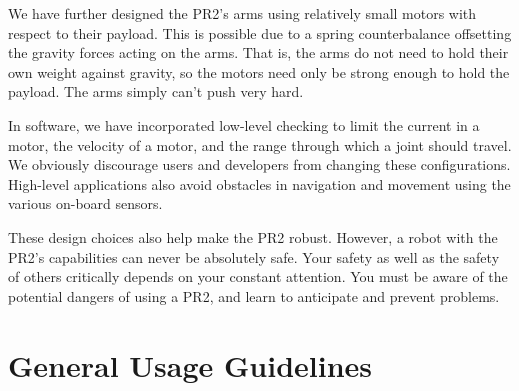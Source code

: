 We have further designed the PR2's arms using relatively small motors with respect to their payload.  This is possible due to a spring counterbalance offsetting the gravity forces acting on the arms.  That is, the arms do not need to hold their own weight against gravity, so the motors need only be strong enough to hold the payload.  The arms simply can't push very hard.

In software, we have incorporated low-level checking to limit the current in a motor, the velocity of a motor, and the range through which a joint should travel.  We obviously discourage users and developers from changing these configurations.  High-level applications also avoid obstacles in navigation and movement using the various on-board sensors.  

These design choices also help make the PR2 robust.  However, a robot with the PR2’s capabilities can never be absolutely safe. Your safety as well as the safety of others critically depends on your constant attention. You must be aware of the potential dangers of using a PR2, and learn to anticipate and prevent problems.

\section{General Usage Guidelines}

